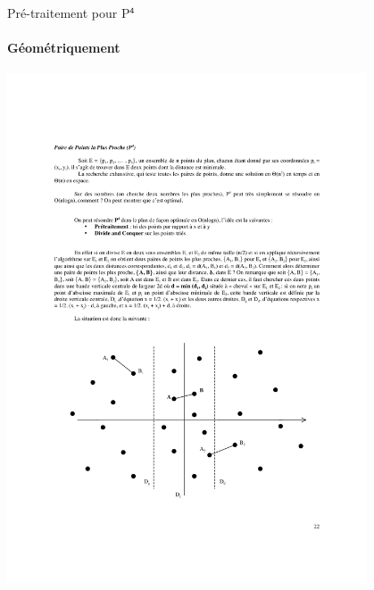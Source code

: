 \documentclass[aspectratio=1610,francais,envcountsect]{beamer}
\begin{document}
\begin{frame}[allowframebreaks]{Pré-traitement pour P$^\mathsf{4}$ \insertcontinuationtext}
  \framesubtitle{Géométriquement}

  \begin{center}
    \includegraphics[width=0.8\textwidth]{p4}
  \end{center}
\end{frame}
\end{document}
